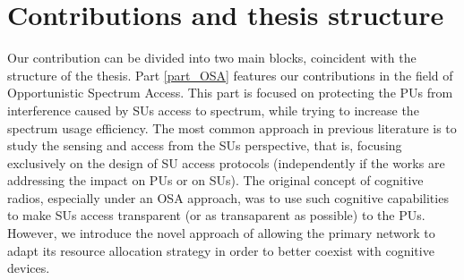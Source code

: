 

\section{Contributions and thesis structure}

Our contribution can be divided into two main blocks, coincident with the structure of the thesis. 
Part \ref{part_OSA} features our contributions in the field of Opportunistic Spectrum Access. 
This part is focused on protecting the PUs from interference caused by SUs access to spectrum, while trying to increase the spectrum usage efficiency. 
The most common approach in previous literature is to study the sensing and access from the SUs perspective, that is, focusing exclusively on the design of SU access protocols (independently if the works are addressing the impact on PUs or on SUs).
The original concept of cognitive radios, especially under an OSA approach, was to use such cognitive capabilities to make SUs access transparent (or as transaparent as possible) to the PUs. 
However, we introduce the novel approach of allowing the primary network to adapt its resource allocation strategy in order to better coexist with cognitive devices. 

